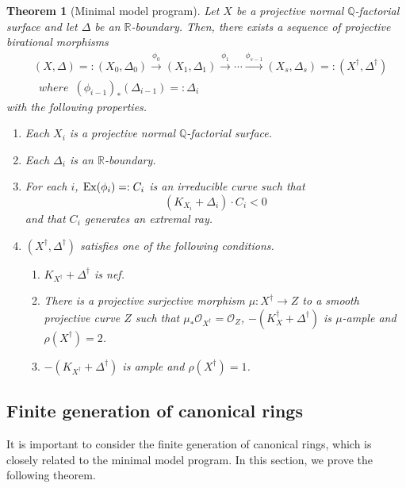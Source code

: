 \documentclass[12pt,twoside]{amsart}
\newtheorem{thm}{Theorem}[section]
\theoremstyle{definition}
\newcommand{\Q}{$\mathbb{Q}$}
\newcommand{\R}{$\mathbb{R}$}
\begin{document}
\begin{thm}[Minimal model program]\label{qfacmmp}
Let $X$ be a projective normal \Q-factorial surface and 
let $\Delta$ be an $\mathbb{R}$-boundary. 
Then, there exists a sequence of projective birational morphisms 
\begin{eqnarray*}
&(X, \Delta)=:(X_0, \Delta_0) \overset{\phi_0}\to 
(X_1, \Delta_1) \overset{\phi_1}\to \cdots 
\overset{\phi_{s-1}}\to (X_s, \Delta_s)=:(X^{\dagger}, \Delta^{\dagger})\\
&\,\,\,where\,\,\,(\phi_{i-1})_*(\Delta_{i-1})=:\Delta_i
\end{eqnarray*}
with the following properties. 
\begin{enumerate}
\item{Each $X_i$ is a projective normal \Q-factorial surface.}
\item{Each $\Delta_i$ is an \R-boundary.} 
\item{For each $i$, ${\rm Ex}(\phi_i)=:C_i$ is an irreducible curve such that 
$$(K_{X_i}+\Delta_i)\cdot C_i<0$$
and that $C_i$ generates an extremal ray.}
\item{$(X^{\dagger}, \Delta^{\dagger})$ satisfies one of the following conditions.
\begin{enumerate}
\item{$K_{X^{\dagger}}+\Delta^{\dagger}$ is nef.}
\item{There is a projective surjective morphism $\mu:X^{\dagger} \to Z$ to 
a smooth projective curve $Z$ such that $\mu_*\mathcal O_{X^{\dagger}}=\mathcal O_Z$, 
$-(K_X^{\dagger}+\Delta^{\dagger})$ is $\mu$-ample and $\rho(X^{\dagger})=2$.}
\item{$-(K_{X^{\dagger}}+\Delta^{\dagger})$ is ample and 
$\rho(X^{\dagger})=1$.}
\end{enumerate}}
\end{enumerate}
\end{thm}









\subsection{Finite generation of canonical rings}

It is important to consider the finite generation of canonical rings, 
which is closely related to the minimal model program. 
In this section, we prove the following theorem. 
\end{document}
